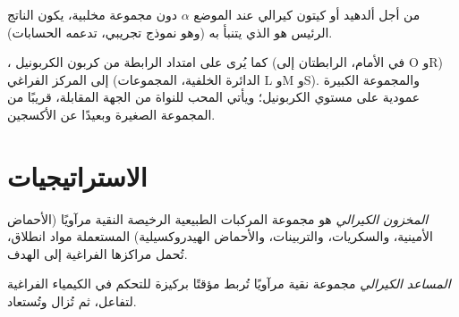 \begin{proposition}\label{prop:b3:asymmetric-synthesis:felkin}
من أجل ألدهيد أو كيتون كيرالي عند الموضع $\alpha$ دون مجموعة مخلبية، يكون الناتج
الرئيس هو الذي يتنبأ به  (وهو نموذج تجريبي،
تدعمه الحسابات). \admitted
\end{proposition}

\begin{omfigure}

{\small {}، كما يُرى على امتداد الرابطة من كربون الكربونيل (في الأمام،
الرابطتان إلى O وR) إلى المركز الفراغي (الدائرة الخلفية، المجموعات L وM وS). 
والمجموعة الكبيرة عمودية على مستوي الكربونيل؛ ويأتي المحب للنواة من
الجهة المقابلة، قريبًا من المجموعة الصغيرة وبعيدًا عن الأكسجين.}
\end{omfigure}

\section{الاستراتيجيات}

\begin{definition}\label{def:b3:asymmetric-synthesis:chiral-pool}
\emph{المخزون الكيرالي} هو مجموعة المركبات الطبيعية
الرخيصة النقية مرآويًا (الأحماض الأمينية، والسكريات، والتربينات، والأحماض الهيدروكسيلية) المستعملة
مواد انطلاق، تُحمل مراكزها الفراغية إلى الهدف.
\end{definition}

\begin{definition}\label{def:b3:asymmetric-synthesis:auxiliary}
\emph{المساعد الكيرالي} مجموعة نقية مرآويًا
تُربط مؤقتًا بركيزة للتحكم في الكيمياء الفراغية لتفاعل،
ثم تُزال وتُستعاد.
\end{definition}

